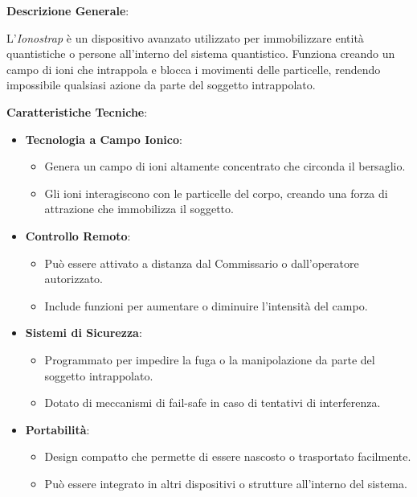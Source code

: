 \begin{tcolorbox}[fontupper=\tiny, fontlower=\Large,colback=white,colframe=black,title=\textbf{Ionostrap}]
\begin{multicols}{2}
\textbf{Descrizione Generale}:

L'\emph{Ionostrap} è un dispositivo avanzato utilizzato per immobilizzare entità quantistiche o persone all'interno del sistema quantistico. Funziona creando un campo di ioni che intrappola e blocca i movimenti delle particelle, rendendo impossibile qualsiasi azione da parte del soggetto intrappolato.

\textbf{Caratteristiche Tecniche}:

\begin{itemize}
    \item \textbf{Tecnologia a Campo Ionico}:
    \begin{itemize}
        \item Genera un campo di ioni altamente concentrato che circonda il bersaglio.
        \item Gli ioni interagiscono con le particelle del corpo, creando una forza di attrazione che immobilizza il soggetto.
    \end{itemize}
    \item \textbf{Controllo Remoto}:
    \begin{itemize}
        \item Può essere attivato a distanza dal Commissario o dall'operatore autorizzato.
        \item Include funzioni per aumentare o diminuire l'intensità del campo.
    \end{itemize}
    \item \textbf{Sistemi di Sicurezza}:
    \begin{itemize}
        \item Programmato per impedire la fuga o la manipolazione da parte del soggetto intrappolato.
        \item Dotato di meccanismi di fail-safe in caso di tentativi di interferenza.
    \end{itemize}
    \item \textbf{Portabilità}:
    \begin{itemize}
        \item Design compatto che permette di essere nascosto o trasportato facilmente.
        \item Può essere integrato in altri dispositivi o strutture all'interno del sistema.
    \end{itemize}
\end{itemize}


\end{multicols}
\end{tcolorbox}
